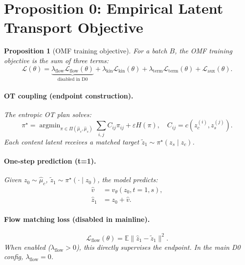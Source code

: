\documentclass[letterpaper]{article}
\newtheorem{proposition}{Proposition}[section]
\newcommand{\E}{\mathbb{E}}
\newcommand{\cL}{\mathcal{L}}
\newcommand{\argmin}{\operatorname{argmin}}
\begin{document}
\section{Proposition 0: Empirical Latent Transport Objective}

\begin{proposition}[OMF training objective]
\label{prop:objective}
For a batch $B$, the OMF training objective is the sum of three terms:
\begin{equation}
    \cL(\theta) = \underbrace{\lambda_{\text{flow}}\cL_{\text{flow}}(\theta)}_{\text{disabled in D0}}
    + \lambda_{\text{kin}}\cL_{\text{kin}}(\theta)
    + \lambda_{\text{term}}\cL_{\text{term}}(\theta)
    + \cL_{\text{aux}}(\theta).
    \label{eq:omf_objective}
\end{equation}

\paragraph{OT coupling (endpoint construction).}
The entropic OT plan solves:
\begin{equation}
    \pi^\star = \argmin_{\pi\in\Pi(\hat\mu_c,\hat\mu_s)}
    \sum_{i,j}C_{ij}\pi_{ij} + \varepsilon H(\pi),\quad
    C_{ij}=c(z_c^{(i)}, z_s^{(j)}).
\end{equation}
Each content latent receives a matched target $\tilde z_1\sim\pi^\star(z_s\mid z_c)$.

\paragraph{One-step prediction (t=1).}
Given $z_0\sim\hat\mu_c$, $\tilde z_1\sim\pi^\star(\cdot\mid z_0)$, the model predicts:
\begin{align}
    \hat v &= v_\theta(z_0, t=1, s), \label{eq:omf_velocity} \\
    \hat z_1 &= z_0 + \hat v. \label{eq:omf_endpoint}
\end{align}

\paragraph{Flow matching loss (disabled in mainline).}
\begin{equation}
    \cL_{\text{flow}}(\theta) = \E\bigl\| \hat z_1 - \tilde z_1 \bigr\|^2.
    \label{eq:flow_loss}
\end{equation}
When enabled ($\lambda_{\text{flow}}>0$), this directly supervises the endpoint.
In the main D0 config, $\lambda_{\text{flow}}=0$.


\end{proposition}
\end{document}
